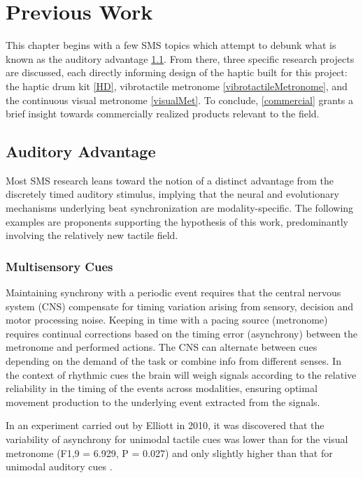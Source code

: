 \chapter{Previous Work}

This chapter begins with a few SMS topics which attempt to debunk what is known as the auditory advantage \ref{AudAdv}. From there, three specific research projects are discussed, each directly informing design of the haptic built for this project: the haptic drum kit \ref{HD}, vibrotactile metronome \ref{vibrotactileMetronome}, and the continuous visual metronome \ref{visualMet}. To conclude, \ref{commercial} grants a brief insight towards commercially realized products relevant to the field.

\section{Auditory Advantage} \label{AudAdv}
Most SMS research leans toward the notion of a distinct advantage from the discretely timed auditory stimulus, implying that the neural and evolutionary mechanisms underlying beat synchronization are modality-specific. The following examples are proponents supporting the hypothesis of this work, predominantly involving the relatively new tactile field.

\subsection{Multisensory Cues}
Maintaining synchrony with a periodic event requires that the central nervous system (CNS) compensate for timing variation arising from sensory, decision and motor processing noise. Keeping in time with a pacing source (metronome) requires continual corrections based on the timing error (asynchrony) between the metronome and performed actions. The CNS can alternate between cues depending on the demand of the task or combine info from different senses. In the context of rhythmic cues the brain will weigh signals according to the relative reliability in the timing of the events across modalities, ensuring optimal movement production to the underlying event extracted from the signals. 

In an experiment carried out by Elliott in 2010, it was discovered that the variability of asynchrony for unimodal tactile cues was lower than for the visual metronome (F1,9 = 6.929, P = 0.027) and only slightly higher than that for unimodal auditory cues \cite{elliott2010multisensory}.

